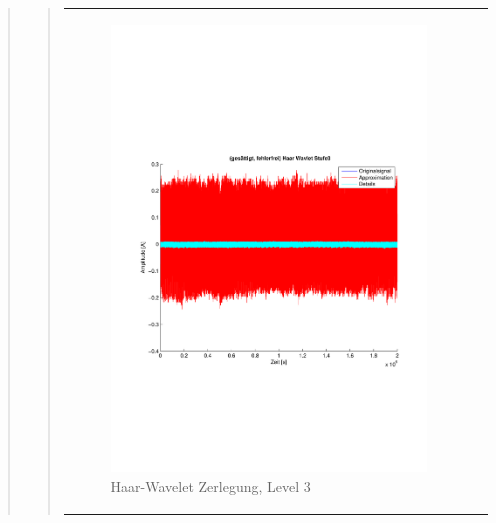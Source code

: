 \begin{quote}
\begin{quote}
       
        \begin{center}
                \begin{tabular}{ll}
    
                \hspace{-8em}
                    \begin{minipage}{0.6\textwidth}
    
                        \begin{figure}[H]
                            \label{fig:}
                            \includegraphics[scale=0.4, trim = 2cm 6cm 1cm
                            7.5cm,
                            clip]{./Bilder/Termin8/fehlerfrei_gesaettigt_Haar_Wavlet_lvl_3}
                            \caption{Haar-Wavelet Zerlegung, Level 3}
                        \end{figure}
    

\end{minipage}
\end{tabular}
\end{center}
\end{quote}
\end{quote}
